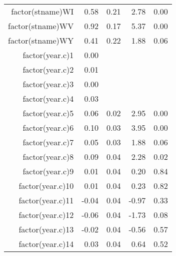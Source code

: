 \begin{table}[ht]
\begin{tabular}{rrrrr}
  factor(stname)WI & 0.58 & 0.21 & 2.78 & 0.00 \\ 
  factor(stname)WV & 0.92 & 0.17 & 5.37 & 0.00 \\ 
  factor(stname)WY & 0.41 & 0.22 & 1.88 & 0.06 \\ 
  factor(year.c)1 & 0.00 &  &  &  \\ 
  factor(year.c)2 & 0.01 &  &  &  \\ 
  factor(year.c)3 & 0.00 &  &  &  \\ 
  factor(year.c)4 & 0.03 &  &  &  \\ 
  factor(year.c)5 & 0.06 & 0.02 & 2.95 & 0.00 \\ 
  factor(year.c)6 & 0.10 & 0.03 & 3.95 & 0.00 \\ 
  factor(year.c)7 & 0.05 & 0.03 & 1.88 & 0.06 \\ 
  factor(year.c)8 & 0.09 & 0.04 & 2.28 & 0.02 \\ 
  factor(year.c)9 & 0.01 & 0.04 & 0.20 & 0.84 \\ 
  factor(year.c)10 & 0.01 & 0.04 & 0.23 & 0.82 \\ 
  factor(year.c)11 & -0.04 & 0.04 & -0.97 & 0.33 \\ 
  factor(year.c)12 & -0.06 & 0.04 & -1.73 & 0.08 \\ 
  factor(year.c)13 & -0.02 & 0.04 & -0.56 & 0.57 \\ 
  factor(year.c)14 & 0.03 & 0.04 & 0.64 & 0.52 \\ 
   \hline
\end{tabular}
\end{table}
